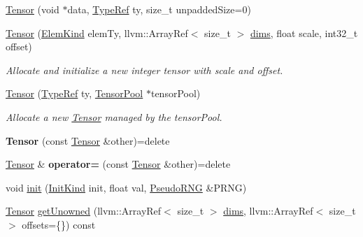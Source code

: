 \begin{DoxyCompactItemize}
\hyperlink{classglow_1_1_tensor_a647b7d8c649846c034297a04d4c3680b}{Tensor} (void $\ast$data, \hyperlink{structglow_1_1_type}{Type\+Ref} ty, size\+\_\+t unpadded\+Size=0)
\item 
\mbox{\label{classglow_1_1_tensor_af7361b57a0c9de802be4922c950962dd}} 
\hyperlink{classglow_1_1_tensor_af7361b57a0c9de802be4922c950962dd}{Tensor} (\hyperlink{namespaceglow_ab92e14a94329daf4083db670e95fbcdf}{Elem\+Kind} elem\+Ty, llvm\+::\+Array\+Ref$<$ size\+\_\+t $>$ \hyperlink{classglow_1_1_tensor_ad299b107d8ed92bb55392c4cb97070d9}{dims}, float scale, int32\+\_\+t offset)
\begin{DoxyCompactList}\small\item\em Allocate and initialize a new integer tensor with {\ttfamily scale} and {\ttfamily offset}. \end{DoxyCompactList}\item 
\mbox{\label{classglow_1_1_tensor_ad8b1303d86eb052f1613a399d83e420e}} 
\hyperlink{classglow_1_1_tensor_ad8b1303d86eb052f1613a399d83e420e}{Tensor} (\hyperlink{structglow_1_1_type}{Type\+Ref} ty, \hyperlink{classglow_1_1_tensor_pool}{Tensor\+Pool} $\ast$tensor\+Pool)
\begin{DoxyCompactList}\small\item\em Allocate a new \hyperlink{classglow_1_1_tensor}{Tensor} managed by the {\ttfamily tensor\+Pool}. \end{DoxyCompactList}\item 
\mbox{\label{classglow_1_1_tensor_a3c34395273dedd71eb372cb1c9a3a102}} 
{\bfseries Tensor} (const \hyperlink{classglow_1_1_tensor}{Tensor} \&other)=delete
\item 
\mbox{\label{classglow_1_1_tensor_aaa46002e4a5dce0acb4ad5f130af344f}} 
\hyperlink{classglow_1_1_tensor}{Tensor} \& {\bfseries operator=} (const \hyperlink{classglow_1_1_tensor}{Tensor} \&other)=delete
\item 
void \hyperlink{classglow_1_1_tensor_a57bee99ef7a8498018fe4471574a10e9}{init} (\hyperlink{classglow_1_1_tensor_a20209a68c0539dfff33c065fe8358073}{Init\+Kind} init, float val, \hyperlink{classglow_1_1_pseudo_r_n_g}{Pseudo\+R\+NG} \&P\+R\+NG)
\item 
\hyperlink{classglow_1_1_tensor}{Tensor} \hyperlink{classglow_1_1_tensor_a2b71346a672215c780ec46d1925c6d03}{get\+Unowned} (llvm\+::\+Array\+Ref$<$ size\+\_\+t $>$ \hyperlink{classglow_1_1_tensor_ad299b107d8ed92bb55392c4cb97070d9}{dims}, llvm\+::\+Array\+Ref$<$ size\+\_\+t $>$ offsets=\{\}) const

\end{DoxyCompactItemize}
